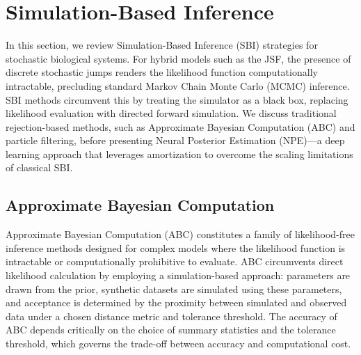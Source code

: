 \documentclass{article}
\begin{document}


\section{Simulation-Based Inference}\label{sec:inference_methods}

In this section, we review Simulation-Based Inference (SBI) strategies for stochastic biological systems. For hybrid models such as the JSF, the presence of discrete stochastic jumps renders the likelihood function computationally intractable, precluding standard Markov Chain Monte Carlo (MCMC) inference. SBI methods circumvent this by treating the simulator as a black box, replacing likelihood evaluation with directed forward simulation. We discuss traditional rejection-based methods, such as Approximate Bayesian Computation (ABC) and particle filtering, before presenting Neural Posterior Estimation (NPE)—a deep learning approach that leverages amortization to overcome the scaling limitations of classical SBI.


\subsection{Approximate Bayesian Computation}
Approximate Bayesian Computation (ABC) \cite{alahmadi2020ABC} constitutes a family of likelihood-free inference methods designed for complex models where the likelihood function is intractable or computationally prohibitive to evaluate. ABC circumvents direct likelihood calculation by employing a simulation-based approach: parameters are drawn from the prior, synthetic datasets are simulated using these parameters, and acceptance is determined by the proximity between simulated and observed data under a chosen distance metric and tolerance threshold. The accuracy of ABC depends critically on the choice of summary statistics and the tolerance threshold, which governs the trade-off between accuracy and computational cost.
\end{document}
